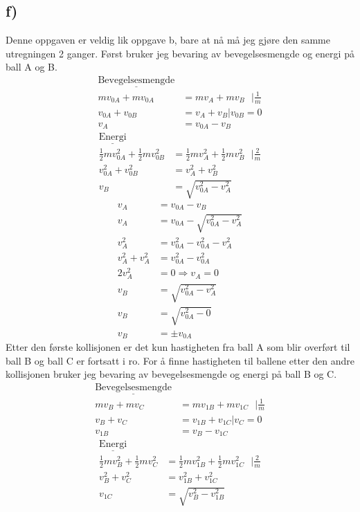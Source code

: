 \documentclass[a4paper,12pt,norsk]{article}
\begin{document}
\subsection*{f)}
Denne oppgaven er veldig lik oppgave b, bare at nå må jeg gjøre den samme utregningen 2 ganger. Først bruker jeg bevaring av bevegelsesmengde og energi på ball A og B.
\begin{align*}
\underline{\textrm{Bevegelsesmengde}}\\
mv_{0A} + mv_{0A} &= mv_A + mv_B\textrm{ } |\frac{1}{m}\\
v_{0A} + v_{0B} &= v_A + v_B | v_{0B} = 0\\
v_A &= v_{0A} - v_B
\end{align*}
\begin{align*}
\underline{\textrm{Energi}}\\
\frac{1}{2}mv_{0A}^2+\frac{1}{2}mv_{0B}^2&=\frac{1}{2}mv_{A}^2+\frac{1}{2}mv_{B}^2 \textrm{ }|\frac{2}{m}\\ 
v_{0A}^2+v_{0B}^2&=v_{A}^2+v_{B}^2\\
v_B &= \sqrt{v_{0A}^2 -v_A^2}
\end{align*}
\begin{align*}
v_A &= v_{0A} - v_B \\
v_A &= v_{0A} - \sqrt{v_{0A}^2 -v_A^2}\\
v_A^2 &= v_{0A}^2 - v_{0A}^2 -v_A^2\\
v_A^2+v_A^2 &= v_{0A}^2 - v_{0A}^2\\
2v_A^2 &= 0 \Rightarrow v_A = 0\\
v_B &= \sqrt{v_{0A}^2 -v_A^2}\\
v_B &= \sqrt{v_{0A}^2 - 0}\\
v_B &= \pm v_{0A}
\end{align*}
Etter den første kollisjonen er det kun hastigheten fra ball A som blir overført til ball B og ball C er fortsatt i ro. For å finne hastigheten til ballene etter den andre kollisjonen bruker jeg bevaring av bevegelsesmengde og energi på ball B og C.
\begin{align*}
\underline{\textrm{Bevegelsesmengde}}\\
mv_{B} + mv_{C} &= mv_{1B} + mv_{1C}\textrm{ } |\frac{1}{m}\\
v_{B} + v_{C} &= v_{1B} + v_{1C} | v_{C} = 0\\
v_{1B} &= v_B - v_{1C}
\end{align*}
\begin{align*}
\underline{\textrm{Energi}}\\
\frac{1}{2}mv_{B}^2+\frac{1}{2}mv_{C}^2&=\frac{1}{2}mv_{1B}^2+\frac{1}{2}mv_{1C}^2 \textrm{ }|\frac{2}{m}\\ 
v_{B}^2+v_{C}^2&=v_{1B}^2+v_{1C}^2\\
v_{1C} &= \sqrt{v_{B}^2 -v_{1B}^2}
\end{align*}
\end{document}
